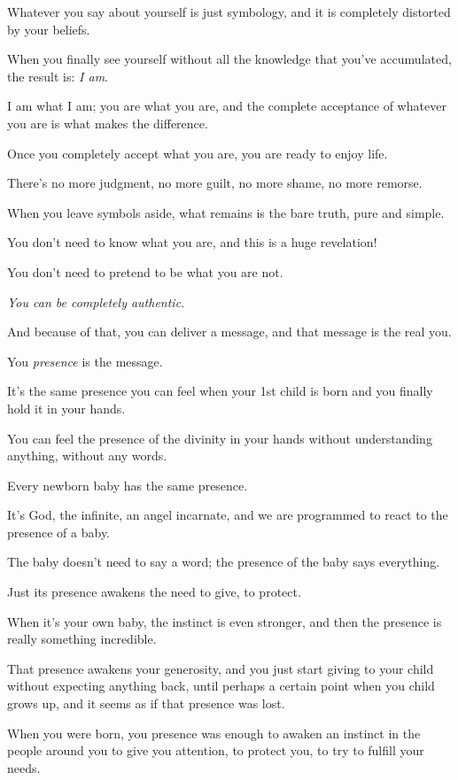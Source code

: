 \documentclass{article}
\numberwithin{equation}{section}
\begin{document}
Whatever you say about yourself is just symbology, and it is completely distorted by your beliefs.

%
When you finally see yourself without all the knowledge that you've accumulated, the result is: \textit{I am}.

I am what I am; you are what you are, and the complete acceptance of whatever you are is what makes the difference.

Once you completely accept what you are, you are ready to enjoy life.

There's no more judgment, no more guilt, no more shame, no more remorse.

%
When you leave symbols aside, what remains is the bare truth, pure and simple.

You don't need to know what you are, and this is a huge revelation!

You don't need to pretend to be what you are not.

\textit{You can be completely authentic}.

And because of that, you can deliver a message, and that message is the real you.

You \textit{presence} is the message.

It's the same presence you can feel when your 1st child is born and you finally hold it in your hands.

You can feel the presence of the divinity in your hands without understanding anything, without any words.

%
Every newborn baby has the same presence.

It's God, the infinite, an angel incarnate, and we are programmed to react to the presence of a baby.

The baby doesn't need to say a word; the presence of the baby says everything.

Just its presence awakens the need to give, to protect.

When it's your own baby, the instinct is even stronger, and then the presence is really something incredible.

That presence awakens your generosity, and you just start giving to your child without expecting anything back, until perhaps a certain point when you child grows up, and it seems as if that presence was lost.

%
When you were born, you presence was enough to awaken an instinct in the people around you to give you attention, to protect you, to try to fulfill your needs.
\end{document}
